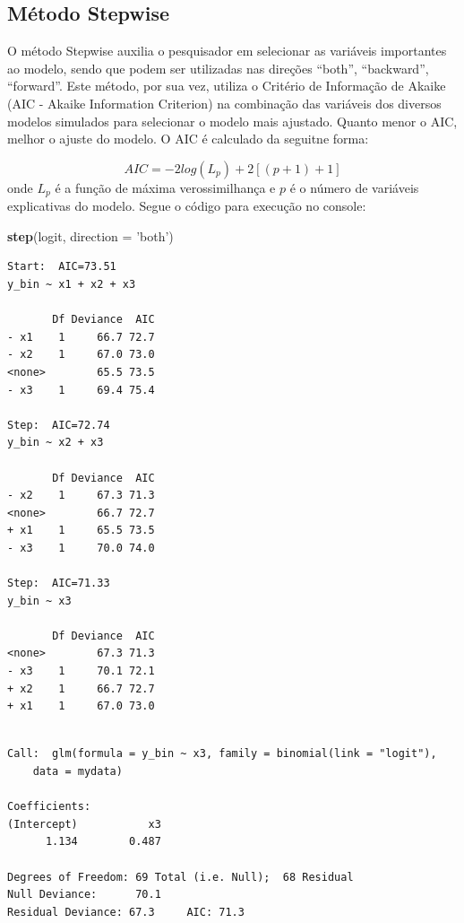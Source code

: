 \documentclass[12pt,brazil,oneside]{book}
\newenvironment{Shaded}{\begin{snugshade}}{\end{snugshade}}
\newcommand{\DataTypeTok}[1]{\textcolor[rgb]{0.13,0.29,0.53}{#1}}
\newcommand{\KeywordTok}[1]{\textcolor[rgb]{0.13,0.29,0.53}{\textbf{#1}}}
\newcommand{\NormalTok}[1]{#1}
\newcommand{\StringTok}[1]{\textcolor[rgb]{0.31,0.60,0.02}{#1}}
\begin{document}
\hypertarget{metodo-stepwise}{%
\subsection{Método Stepwise}\label{metodo-stepwise}}

O método Stepwise auxilia o pesquisador em selecionar as variáveis importantes ao modelo, sendo que podem ser utilizadas nas direções ``both'', ``backward'', ``forward''. Este método, por sua vez, utiliza o Critério de Informação de Akaike (AIC - Akaike Information Criterion) na combinação das variáveis dos diversos modelos simulados para selecionar o modelo mais ajustado. Quanto menor o AIC, melhor o ajuste do modelo. O AIC é calculado da seguitne forma:

\[
AIC = -2log(L_{p})+2[(p+1)+1]
\]
onde \(L_{p}\) é a função de máxima verossimilhança e \(p\) é o número de variáveis explicativas do modelo. Segue o código para execução no console:

\begin{Shaded}
\begin{Highlighting}[]
\KeywordTok{step}\NormalTok{(logit, }\DataTypeTok{direction =} \StringTok{'both'}\NormalTok{)}
\end{Highlighting}
\end{Shaded}

\begin{verbatim}
Start:  AIC=73.51
y_bin ~ x1 + x2 + x3

       Df Deviance  AIC
- x1    1     66.7 72.7
- x2    1     67.0 73.0
<none>        65.5 73.5
- x3    1     69.4 75.4

Step:  AIC=72.74
y_bin ~ x2 + x3

       Df Deviance  AIC
- x2    1     67.3 71.3
<none>        66.7 72.7
+ x1    1     65.5 73.5
- x3    1     70.0 74.0

Step:  AIC=71.33
y_bin ~ x3

       Df Deviance  AIC
<none>        67.3 71.3
- x3    1     70.1 72.1
+ x2    1     66.7 72.7
+ x1    1     67.0 73.0
\end{verbatim}

\begin{verbatim}

Call:  glm(formula = y_bin ~ x3, family = binomial(link = "logit"), 
    data = mydata)

Coefficients:
(Intercept)           x3  
      1.134        0.487  

Degrees of Freedom: 69 Total (i.e. Null);  68 Residual
Null Deviance:      70.1 
Residual Deviance: 67.3     AIC: 71.3
\end{verbatim}
\end{document}
